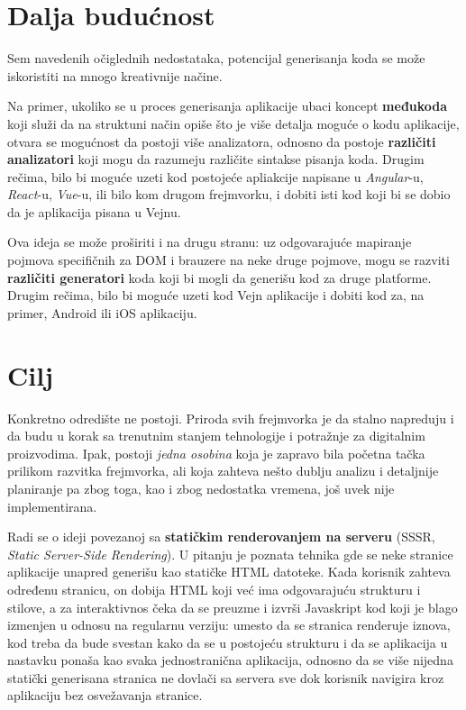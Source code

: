 \section{Dalja budućnost}

Sem navedenih očiglednih nedostataka, potencijal generisanja koda se može iskoristiti na mnogo kreativnije načine.

Na primer, ukoliko se u proces generisanja aplikacije ubaci koncept \textbf{međukoda} koji služi da na struktuni način opiše što je više detalja moguće o kodu aplikacije, otvara se mogućnost da postoji više analizatora, odnosno da postoje \textbf{različiti analizatori} koji mogu da razumeju različite sintakse pisanja koda.
Drugim rečima, bilo bi moguće uzeti kod postojeće apliakcije napisane u \textsl{Angular}-u, \textsl{React}-u, \textsl{Vue}-u, ili bilo kom drugom frejmvorku, i dobiti isti kod koji bi se dobio da je aplikacija pisana u Vejnu.

Ova ideja se može proširiti i na drugu stranu: uz odgovarajuće mapiranje pojmova specifičnih za DOM i brauzere na neke druge pojmove, mogu se razviti \textbf{različiti generatori} koda koji bi mogli da generišu kod za druge platforme.
Drugim rečima, bilo bi moguće uzeti kod Vejn aplikacije i dobiti kod za, na primer, Android ili iOS aplikaciju.

\section{Cilj}

Konkretno odredište ne postoji.
Priroda svih frejmvorka je da stalno napreduju i da budu u korak sa trenutnim stanjem tehnologije i potražnje za digitalnim proizvodima.
Ipak, postoji \emph{jedna osobina} koja je zapravo bila početna tačka prilikom razvitka frejmvorka, ali koja zahteva nešto dublju analizu i detaljnije planiranje pa zbog toga, kao i zbog nedostatka vremena, još uvek nije implementirana.

Radi se o ideji povezanoj sa \textbf{statičkim renderovanjem na serveru} (SSSR, \textsl{Static Server-Side Rendering}).
U pitanju je poznata tehnika gde se neke stranice aplikacije unapred generišu kao statičke HTML datoteke.
Kada korisnik zahteva određenu stranicu, on dobija HTML koji već ima odgovarajuću strukturu i stilove, a za interaktivnos čeka da se preuzme i izvrši Javaskript kod koji je blago izmenjen u odnosu na regularnu verziju: umesto da se stranica renderuje iznova, kod treba da bude svestan kako da se  u postojeću strukturu i da se aplikacija u nastavku ponaša kao svaka jednostranična aplikacija, odnosno da se više nijedna statički generisana stranica ne dovlači sa servera sve dok korisnik navigira kroz aplikaciju bez osvežavanja stranice.

